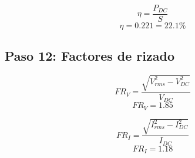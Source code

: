 \documentclass[12pt]{article}
\begin{document}
\begin{equation}
\eta=\frac{P_{DC}}{S}
\end{equation}
\begin{equation}
\boxed{\eta=0.221=22.1\%}
\end{equation}

\subsection*{Paso 12: Factores de rizado}
\begin{equation}
FR_V=\frac{\sqrt{V_{rms}^2-V_{DC}^2}}{V_{DC}}
\end{equation}
\begin{equation}
\boxed{FR_V=1.85}
\end{equation}

\begin{equation}
FR_I=\frac{\sqrt{I_{rms}^2-I_{DC}^2}}{I_{DC}}
\end{equation}
\begin{equation}
\boxed{FR_I=1.18}
\end{equation}
\end{document}
